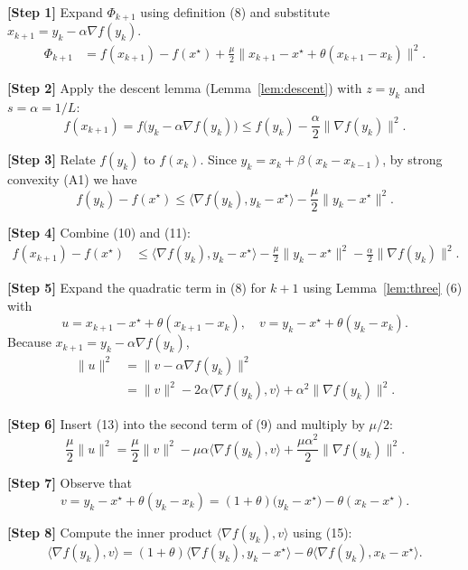\documentclass{article}
\newcommand{\grad}{\nabla}
\begin{document}
\medskip
\noindent\textbf{[Step 1]}  Expand $\Phi_{k+1}$ using definition (8) and substitute $x_{k+1}=y_k-\alpha\grad f(y_k)$.
\[
\begin{aligned}
\Phi_{k+1}
&= f(x_{k+1})-f(x^\star)
   +\frac{\mu}{2}\bigl\|x_{k+1}-x^\star+\theta (x_{k+1}-x_k)\bigr\|^2 .
\end{aligned}
\tag{9}
\]

\noindent\textbf{[Step 2]}  Apply the descent lemma (Lemma~\ref{lem:descent}) with $z=y_k$ and $s=\alpha=1/L$:
\[
f(x_{k+1}) = f\bigl(y_k-\alpha\grad f(y_k)\bigr)
          \le f(y_k)-\frac{\alpha}{2}\|\grad f(y_k)\|^2 .
\tag{10}
\]

\noindent\textbf{[Step 3]}  Relate $f(y_k)$ to $f(x_k)$.  
Since $y_k = x_k+\beta (x_k-x_{k-1})$, by strong convexity (A1) we have
\[
f(y_k)-f(x^\star)\le \langle\grad f(y_k),y_k-x^\star\rangle-\frac{\mu}{2}\|y_k-x^\star\|^2 .
\tag{11}
\]

\noindent\textbf{[Step 4]}  Combine (10) and (11):
\[
\begin{aligned}
f(x_{k+1})-f(x^\star)
&\le \langle\grad f(y_k),y_k-x^\star\rangle
    -\frac{\mu}{2}\|y_k-x^\star\|^2
    -\frac{\alpha}{2}\|\grad f(y_k)\|^2 .
\end{aligned}
\tag{12}
\]

\noindent\textbf{[Step 5]}  Expand the quadratic term in (8) for $k+1$ using Lemma~\ref{lem:three} (6) with
\[
u = x_{k+1}-x^\star+\theta (x_{k+1}-x_k),\quad
v = y_k -x^\star+\theta (y_k-x_k).
\]
Because $x_{k+1}=y_k-\alpha\grad f(y_k)$,
\[
\begin{aligned}
\|u\|^2
&=\|v-\alpha\grad f(y_k)\|^2 \\
&=\|v\|^2-2\alpha\langle\grad f(y_k),v\rangle+\alpha^2\|\grad f(y_k)\|^2 .
\end{aligned}
\tag{13}
\]

\noindent\textbf{[Step 6]}  Insert (13) into the second term of (9) and multiply by $\mu/2$:
\[
\frac{\mu}{2}\|u\|^2
= \frac{\mu}{2}\|v\|^2 - \mu\alpha\langle\grad f(y_k),v\rangle
  +\frac{\mu\alpha^{2}}{2}\|\grad f(y_k)\|^2 .
\tag{14}
\]

\noindent\textbf{[Step 7]}  Observe that
\[
v = y_k-x^\star+\theta (y_k-x_k)
   = (1+\theta)\bigl(y_k-x^\star\bigr)-\theta (x_k-x^\star).
\tag{15}
\]

\noindent\textbf{[Step 8]}  Compute the inner product $\langle\grad f(y_k),v\rangle$ using (15):
\[
\langle\grad f(y_k),v\rangle
= (1+\theta)\langle\grad f(y_k),y_k-x^\star\rangle
  -\theta\langle\grad f(y_k),x_k-x^\star\rangle .
\tag{16}
\]
\end{document}
